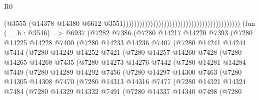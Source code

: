 \begin{lexlean}{R0}
\begin{coremodule}
                                                                                      (@3555
                                                                                        (@14378
                                                                                          @14380
                                                                                          @6612
                                                                                          @3551)))))))))))))))))))))))))))))))))))))))))))
    (fun (__b : @3546) =>
    @6937
      (@7282
        @7386
        (@7280
          @14217
          @14220
          @7393
          (@7280
            @14225
            @14228
            @7400
            (@7280
              @14233
              @14236
              @7407
              (@7280
                @14241
                @14244
                @7414
                (@7280
                  @14249
                  @14252
                  @7421
                  (@7280
                    @14257
                    @14260
                    @7428
                    (@7280
                      @14265
                      @14268
                      @7435
                      (@7280
                        @14273
                        @14276
                        @7442
                        (@7280
                          @14281
                          @14284
                          @7449
                          (@7280
                            @14289
                            @14292
                            @7456
                            (@7280
                              @14297
                              @14300
                              @7463
                              (@7280
                                @14305
                                @14308
                                @7470
                                (@7280
                                  @14313
                                  @14316
                                  @7477
                                  (@7280
                                    @14321
                                    @14324
                                    @7484
                                    (@7280
                                      @14329
                                      @14332
                                      @7491
                                      (@7280
                                        @14337
                                        @14340
                                        @7498
                                        (@7280

\end{coremodule}
\end{lexlean}

